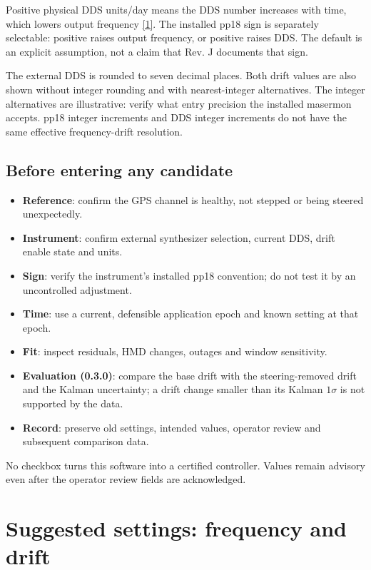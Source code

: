 \documentclass[11pt,a4paper]{article}
\newcommand{\manual}{\href{https://www.gb.nrao.edu/~fghigo/timer/MSMmaser/Maser_UG_75666-201_Rev_J.PDF}{[1]}}
\renewcommand{\_}{\usscore\allowbreak}
\begin{document}
Positive physical DDS units/day means the DDS number increases with time,
which lowers output frequency \manual. The installed pp18 sign is separately
selectable: positive raises output frequency, or positive raises DDS. The
default is an explicit assumption, not a claim that Rev. J documents that sign.

The external DDS is rounded to seven decimal places. Both drift values are
also shown without integer rounding and with nearest-integer alternatives.
The integer alternatives are illustrative: verify what entry precision the
installed masermon accepts. pp18 integer increments and DDS integer increments
do not have the same effective frequency-drift resolution.

\subsection{Before entering any candidate}
\begin{itemize}
\item \textbf{Reference}: confirm the GPS channel is healthy, not stepped or being steered unexpectedly.
\item \textbf{Instrument}: confirm external synthesizer selection, current DDS, drift enable state and units.
\item \textbf{Sign}: verify the instrument's installed pp18 convention; do not test it by an uncontrolled adjustment.
\item \textbf{Time}: use a current, defensible application epoch and known setting at that epoch.
\item \textbf{Fit}: inspect residuals, HMD changes, outages and window sensitivity.
\item \textbf{Evaluation (0.3.0)}: compare the base drift with the steering-removed drift and the Kalman
uncertainty; a drift change smaller than its Kalman \(1\sigma\) is not supported by the data.
\item \textbf{Record}: preserve old settings, intended values, operator review and subsequent comparison data.
\end{itemize}

No checkbox turns this software into a certified controller. Values remain
advisory even after the operator review fields are acknowledged.
\clearpage

\section{Suggested settings: frequency and drift}\label{sec:suggested}
\end{document}
